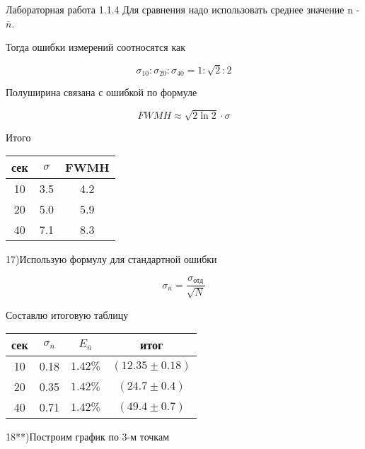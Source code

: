 \documentclass{astroedu-lab}
\begin{document}
\begin{problem}{\large Лабораторная работа 1.1.4}
Для сравнения надо использовать среднее значение n - $\overline{n}$.

Тогда ошибки измерений соотносятся как

\begin{equation}
\sigma_{10} : \sigma_{20} : \sigma_{40} = 1 : \sqrt{2} : 2
\end{equation}

Полуширина связана с ошибкой по формуле

\begin{equation}
FWMH \approx \sqrt{2\ln{2}} \cdot \sigma
\end{equation}

\begin{center}
\newpage
Итого

\begin{tabular}[t]{|c|c|c|}
\hline
сек & $\sigma$ & FWMH \\
\hline
10 & 3.5 & 4.2\\
20 & 5.0 & 5.9\\
40 & 7.1 & 8.3\\
\hline
\end{tabular}
\end{center}

17)Использую формулу для стандартной ошибки

\begin{equation}
\sigma_{\overline{n}} = \frac{\sigma_{\text{отд}}}{\sqrt{N}}
\end{equation}

\begin{center}
Составлю итоговую таблицу

\begin{tabular}[t]{|c|c|c|c|}
\hline
сек & $\sigma_{\overline{n}}$ & $E_{\overline{n}}$ & итог \\
\hline
10 & 0.18 & $1.42\%$ & $(12.35 \pm 0.18)$\\
20 & 0.35 & $1.42\%$ & $(24.7 \pm 0.4)$\\
40 & 0.71 & $1.42\%$ & $(49.4 \pm 0.7)$\\
\hline
\end{tabular}
\end{center}

18**)Построим график по 3-м точкам

\begin{center}
\end{center}


\end{problem}
\end{document}
